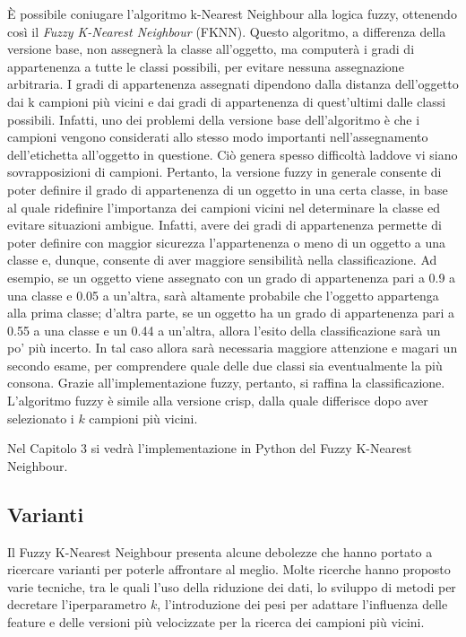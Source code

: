\documentclass[11pt,  oneside, openany]{book}
\begin{document}
\`E possibile coniugare l'algoritmo k-Nearest Neighbour alla logica fuzzy, ottenendo così il \textit{Fuzzy K-Nearest Neighbour} (FKNN). Questo algoritmo, a differenza della versione base, non assegnerà la classe all'oggetto, ma computerà i gradi di appartenenza a tutte le classi possibili, per evitare nessuna assegnazione arbitraria. I gradi di appartenenza assegnati dipendono dalla distanza dell'oggetto dai k campioni più vicini e dai gradi di appartenenza di quest'ultimi dalle classi possibili. Infatti, uno dei problemi della versione base dell'algoritmo è che i campioni vengono considerati allo stesso modo importanti nell'assegnamento dell'etichetta all'oggetto in questione. Ciò genera spesso difficoltà laddove vi siano sovrapposizioni di campioni. Pertanto, la versione fuzzy  in generale consente di poter definire il grado di appartenenza di un oggetto in una certa classe, in base al quale ridefinire l'importanza dei campioni vicini nel determinare la classe ed evitare situazioni ambigue. Infatti, avere dei gradi di appartenenza permette di poter definire con maggior sicurezza l'appartenenza o meno di un oggetto a una classe e, dunque, consente di aver maggiore sensibilità nella classificazione. Ad esempio, se un oggetto viene assegnato con un grado di appartenenza pari a 0.9 a una classe e 0.05 a un'altra, sarà altamente probabile che l'oggetto appartenga alla prima classe; d'altra parte, se un oggetto ha un grado di appartenenza pari a 0.55 a una classe e un 0.44 a un'altra, allora l'esito della classificazione sarà un po' più incerto. In tal caso allora sarà necessaria maggiore attenzione e magari un secondo esame, per comprendere quale delle due classi sia eventualmente la più consona. Grazie all'implementazione fuzzy, pertanto, si raffina la classificazione. L'algoritmo fuzzy è simile alla versione crisp, dalla quale differisce dopo aver selezionato i $k$ campioni più vicini. 

Nel Capitolo 3 si vedrà l'implementazione in Python del Fuzzy K-Nearest Neighbour. 


\subsection{Varianti}

Il Fuzzy K-Nearest Neighbour presenta alcune debolezze che hanno portato a ricercare varianti per poterle affrontare al meglio. Molte ricerche hanno proposto varie tecniche, tra le quali l'uso della riduzione dei dati, lo sviluppo di metodi per decretare l'iperparametro $k$, l'introduzione dei pesi per adattare l'influenza delle feature e delle versioni più velocizzate per la ricerca dei campioni più vicini. 
\end{document}
